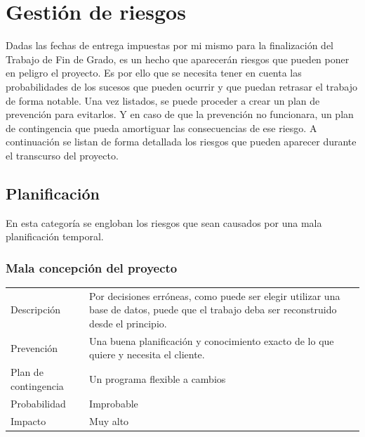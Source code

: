 \section{Gesti\'{o}n de riesgos}
Dadas las fechas de entrega impuestas por mi mismo para la finalizaci\'{o}n del Trabajo de Fin de Grado, es un hecho que
aparecerán riesgos que pueden poner en peligro el proyecto. Es por ello que se necesita tener en cuenta las probabilidades de los sucesos que 
pueden ocurrir y que puedan retrasar el trabajo de forma notable. Una vez
listados, se puede proceder a crear un plan de prevención para evitarlos. Y en caso de que la prevención no
funcionara, un plan de contingencia que pueda amortiguar las consecuencias de ese riesgo. A continuación
se listan de forma detallada los riesgos que pueden aparecer durante el transcurso del proyecto.

\subsection{Planificaci\'{o}n}
En esta categor\'{i}a se engloban los riesgos que sean causados por una mala planificaci\'{o}n temporal.
\subsubsection{Mala concepci\'{o}n del proyecto}
\begin{table}[H]
    \begin{center}
       \begin{tabular}{l p{8cm}}
           Descripci\'{o}n                 & Por decisiones erróneas, como puede ser elegir utilizar una
           base de datos, puede que el trabajo deba ser reconstruido desde el principio. \\
           Prevenci\'{o}n                  & Una buena planificación y conocimiento exacto de lo que quiere y necesita el cliente. \\ 
           Plan de contingencia            & Un programa flexible a cambios \\
           Probabilidad                    & Improbable \\
           Impacto                         & Muy alto\\
        \end{tabular}
    \end{center}
    
\end{table}
